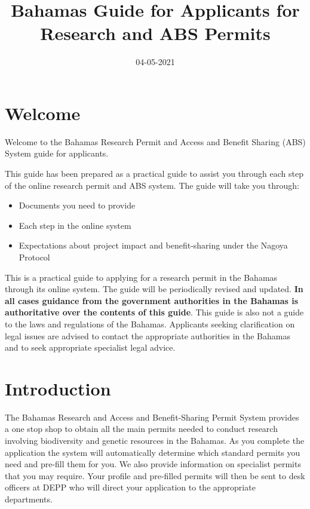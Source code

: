 \documentclass[
]{book}
\title{Bahamas Guide for Applicants for Research and ABS Permits}
\author{}
\date{\vspace{-2.5em}04-05-2021}
\providecommand{\tightlist}{%
  \setlength{\itemsep}{0pt}\setlength{\parskip}{0pt}}
\begin{document}
\maketitle

{
\setcounter{tocdepth}{1}
\tableofcontents
}
\hypertarget{welcome}{%
\chapter*{Welcome}\label{welcome}}

Welcome to the Bahamas Research Permit and Access and Benefit Sharing (ABS) System guide for applicants.

This guide has been prepared as a practical guide to assist you through each step of the online research permit and ABS system. The guide will take you through:

\begin{itemize}
\tightlist
\item
  Documents you need to provide
\item
  Each step in the online system
\item
  Expectations about project impact and benefit-sharing under the Nagoya Protocol
\end{itemize}

This is a practical guide to applying for a research permit in the Bahamas through its online system. The guide will be periodically revised and updated. \textbf{In all cases guidance from the government authorities in the Bahamas is authoritative over the contents of this guide}. This guide is also not a guide to the laws and regulations of the Bahamas. Applicants seeking clarification on legal issues are advised to contact the appropriate authorities in the Bahamas and to seek appropriate specialist legal advice.

\hypertarget{introduction}{%
\chapter*{Introduction}\label{introduction}}

The Bahamas Research and Access and Benefit-Sharing Permit System provides a one stop shop to obtain all the main permits needed to conduct research involving biodiversity and genetic resources in the Bahamas. As you complete the application the system will automatically determine which standard permits you need and pre-fill them for you. We also provide information on specialist permits that you may require. Your profile and pre-filled permits will then be sent to desk officers at DEPP who will direct your application to the appropriate departments.
\end{document}
